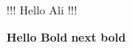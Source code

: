 \documentclass{article}
\begin{document}
!!! Hello Ali !!!

\textbf{Hello Bold}
\newpage
\textbf{next bold}
\end{document}
